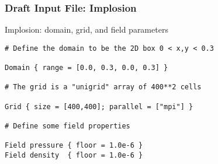     \begin{frame}[fragile] \frametitle{Draft Input File: Implosion}
 \footnotesize
\begin{block}{Implosion: domain, grid, and field parameters}
\begin{verbatim}
# Define the domain to be the 2D box 0 < x,y < 0.3

Domain { range = [0.0, 0.3, 0.0, 0.3] } 
                                
# The grid is a "unigrid" array of 400**2 cells
 
Grid { size = [400,400]; parallel = ["mpi"] }

# Define some field properties
                                
Field pressure { floor = 1.0e-6 }
Field density  { floor = 1.0e-6 }
\end{verbatim}
\end{block}
\end{frame}
